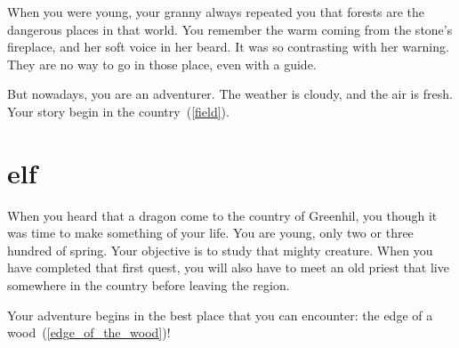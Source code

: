 When you were young, your granny always repeated you that forests are the
dangerous places in that world. You remember the warm coming from the
stone's fireplace, and her soft voice in her beard. It was so contrasting with
her warning. They are no way to go in those place, even with a guide.

But nowadays, you are an adventurer. The weather is cloudy, and the air is
fresh. Your story begin in the country~(\ref{field}).

\section{elf}

When you heard that a dragon come to the country of Greenhil, you though it was
time to make something of your life. You are young, only two or three hundred
of spring. Your objective is to study that mighty creature. When you have
completed that first quest, you will also have to meet an old priest that live
somewhere in the country before leaving the region.

Your adventure begins in the best place that you can encounter: the edge of a
wood~(\ref{edge_of_the_wood})!
